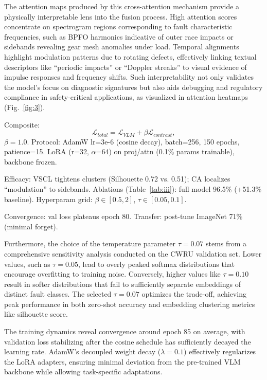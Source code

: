 The attention maps produced by this cross-attention mechanism provide a physically interpretable lens into the fusion process. High attention scores concentrate on spectrogram regions corresponding to fault characteristic frequencies, such as BPFO harmonics indicative of outer race impacts or sidebands revealing gear mesh anomalies under load. Temporal alignments highlight modulation patterns due to rotating defects, effectively linking textual descriptors like ``periodic impacts'' or ``Doppler streaks'' to visual evidence of impulse responses and frequency shifts. Such interpretability not only validates the model's focus on diagnostic signatures but also aids debugging and regulatory compliance in safety-critical applications, as visualized in attention heatmaps (Fig.~\ref{fig:3}).

Composite:
\begin{equation}
\mathcal{L}_{total} = \mathcal{L}_{VLM} + \beta \mathcal{L}_{contrast},
\label{eq:f6}
\end{equation}
$\beta=1.0$. Protocol: AdamW lr=3e-6 (cosine decay), batch=256, 150 epochs, patience=15. LoRA (r=32, $\alpha$=64) on proj/attn (0.1\% params trainable), backbone frozen.

Efficacy: VSCL tightens clusters (Silhouette 0.72 vs. 0.51); CA localizes ``modulation'' to sidebands. Ablations (Table~\ref{tab:iii}): full model 96.5\% (+51.3\% baseline). Hyperparam grid: $\beta\in[0.5,2]$, $\tau\in[0.05,0.1]$.

Convergence: val loss plateaus epoch 80. Transfer: post-tune ImageNet 71\% (minimal forget).

Furthermore, the choice of the temperature parameter $\tau = 0.07$ stems from a comprehensive sensitivity analysis conducted on the CWRU validation set. Lower values, such as $\tau = 0.05$, lead to overly peaked softmax distributions that encourage overfitting to training noise. Conversely, higher values like $\tau = 0.10$ result in softer distributions that fail to sufficiently separate embeddings of distinct fault classes. The selected $\tau = 0.07$ optimizes the trade-off, achieving peak performance in both zero-shot accuracy and embedding clustering metrics like silhouette score.

The training dynamics reveal convergence around epoch 85 on average, with validation loss stabilizing after the cosine schedule has sufficiently decayed the learning rate. AdamW's decoupled weight decay ($\lambda=0.1$) effectively regularizes the LoRA adapters, ensuring minimal deviation from the pre-trained VLM backbone while allowing task-specific adaptations.

